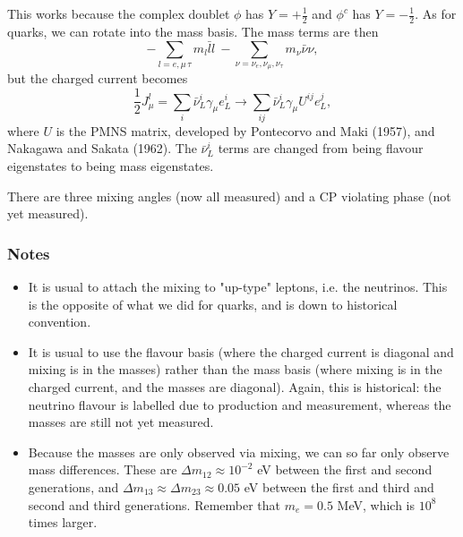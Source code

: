 This works because the complex doublet $\phi$ has $Y=+\frac{1}{2}$ and $\phi^c$ has $Y=-\frac{1}{2}$.  As for quarks, we can rotate into the mass basis. The mass terms are then
\begin{equation}
-\sum_{l=e, \mu\,\tau} m_l \bar{l}l\ - \sum_{\nu=\nu_e,\nu_\mu, \nu_\tau} m_\nu \bar{\nu}\nu,
\end{equation}
but the charged current becomes
\begin{equation}
\frac{1}{2}J_\mu^l = \sum_i \bar{\nu}_L^i \gamma_\mu e_L^i \to \sum_{ij} \bar{\nu}_L^i \gamma_\mu U^{ij}e_L^j,
\end{equation}
where $U$ is the PMNS matrix, developed by Pontecorvo and Maki (1957), and Nakagawa and Sakata (1962). The $\bar{\nu}_L^i$ terms are changed from being flavour eigenstates to being mass eigenstates.

There are three mixing angles (now all measured) and a CP violating phase (not yet measured).
\subsubsection{Notes}
\begin{itemize}
\item It is usual to attach the mixing to "up-type" leptons, i.e. the neutrinos. This is the opposite of what we did for quarks, and is down to historical convention.
\item It is usual to use the flavour basis (where the charged current is diagonal and mixing is in the masses) rather than the mass basis (where mixing is in the charged current, and the masses are diagonal). Again, this is historical: the neutrino flavour is labelled due to production and measurement, whereas the masses are still not yet measured.
\item Because the masses are only observed via mixing, we can so far only observe mass differences. These are $\Delta m_{12} \approx 10^{-2}$ eV between the first and second generations, and $\Delta m_{13} \approx \Delta m_{23} \approx 0.05$ eV between the first and third and second and third generations. Remember that $m_e =0.5$ MeV, which is $10^8$ times larger.
\end{itemize}
